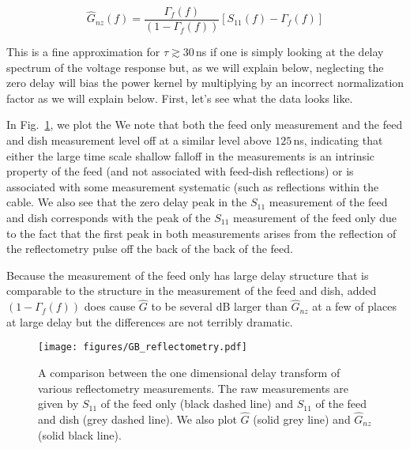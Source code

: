 \documentclass{article}
\begin{document}
\begin{equation}\label{eq:estimateNoZ}
\widehat{G}_{nz}(f) = \frac{\Gamma_f(f)}{(1-\Gamma_f(f))} \left[ S_{11}(f) - \Gamma_f(f) \right]
\end{equation}


This is a fine approximation for $\tau\gtrsim 30\,$ns if one is simply looking at the delay spectrum of the voltage response but, as we will explain below, neglecting the zero delay will bias the power kernel by multiplying by an incorrect normalization factor as we will explain below. First, let's see what the data looks like.

In Fig.~\ref{fig:Reflectometry}, we plot the We note that both the feed only measurement and the feed and dish measurement level off at a similar level above  $125$\,ns, indicating that either the large time scale shallow falloff in the measurements is an intrinsic property of the feed (and not associated with feed-dish reflections) or is associated with some measurement systematic (such as reflections within the cable. We also see that the zero delay peak in the $S_{11}$ measurement of the feed and dish corresponds with the peak of the $S_{11}$ measurement of the feed only due to the fact that the first peak in both measurements arises from the reflection of the reflectometry pulse off the back of the back of the feed. 

Because the measurement of the feed only has large delay structure that is comparable to the structure in the measurement of the feed and dish, added $(1-\Gamma_f(f))$ does cause $\widehat{G}$ to be several dB larger than $\widehat{G}_{nz}$ at a few of places at large delay but the differences are not terribly dramatic. 


\begin{figure}
\texttt{[image: figures/GB\_reflectometry.pdf]}
\caption{A comparison between the one dimensional delay transform of various reflectometry measurements. The raw measurements are given by $S_{11}$ of the feed only (black dashed line) and $S_{11}$ of the feed and dish (grey dashed line). We also plot $\widehat{G}$  (solid grey line) and $\widehat{G}_{nz}$ (solid black line).  }
\label{fig:Reflectometry}
\end{figure}
 
\end{document}
